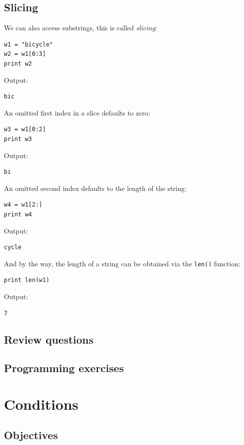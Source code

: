 \subsection{Slicing}

We can also access substrings, this is called {\em slicing}:

\begin{verbatim}
w1 = "bicycle"
w2 = w1[0:3]
print w2
\end{verbatim}
Output:

\begin{verbatim}
bic
\end{verbatim}
An omitted first index in a slice defaults to zero:

\begin{verbatim}
w3 = w1[0:2]
print w3
\end{verbatim}
Output:

\begin{verbatim}
bi
\end{verbatim}
An omitted second index defaults to the length of the string:

\begin{verbatim}
w4 = w1[2:]
print w4
\end{verbatim}
Output:

\begin{verbatim}
cycle
\end{verbatim}
And by the way, the length of a string can be obtained via the {\tt len()} function:

\begin{verbatim}
print len(w1)
\end{verbatim}
Output:

\begin{verbatim}
7
\end{verbatim}

\subsection{Review questions}

\subsection{Programming exercises}

\section{Conditions}

\subsection{Objectives}

